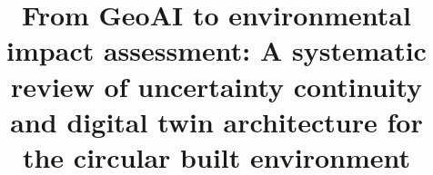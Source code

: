 \documentclass[preprint,11pt,authoryear]{elsarticle}
\begin{document}
\begin{frontmatter}
\title{From GeoAI to environmental impact assessment: A systematic review of uncertainty continuity and digital twin architecture for the circular built environment}
\end{frontmatter}

\end{document}
